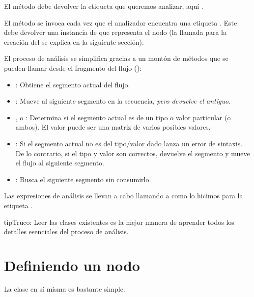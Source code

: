 \documentclass[letterpaper,10pt,spanish]{sphinxmanual}
\begin{document}
El método  debe devolver la etiqueta que queremos analizar, aquí .

El método  se invoca cada vez que el analizador encuentra una etiqueta . Este debe devolver una instancia de  que representa el nodo (la llamada para la creación del  se explica en la siguiente sección).

El proceso de análisis se simplifica gracias a un montón de métodos que se pueden llamar desde el fragmento del flujo ():
\begin{itemize}
\item {} 
: Obtiene el segmento actual del flujo.

\item {} 
: Mueve al siguiente segmento en la secuencia, \emph{pero devuelve el antiguo}.

\item {} 
,  o : Determina si el segmento actual es de un tipo o valor particular (o ambos). El valor puede ser una matriz de varios posibles valores.

\item {} 
: Si el segmento actual no es del tipo/valor dado lanza un error de sintaxis. De lo contrario, si el tipo y valor son correctos, devuelve el segmento y mueve el flujo al siguiente segmento.

\item {} 
: Busca el siguiente segmento sin consumirlo.

\end{itemize}

Las expresiones de análisis se llevan a cabo llamando a  como lo hicimos para la etiqueta .

\begin{notice}{tip}{Truco:}
Leer las clases  existentes es la mejor manera de aprender todos los detalles esenciales del proceso de análisis.
\end{notice}


\section{Definiendo un nodo}
\label{advanced:definiendo-un-nodo}
La clase  en sí misma es bastante simple:
\end{document}
